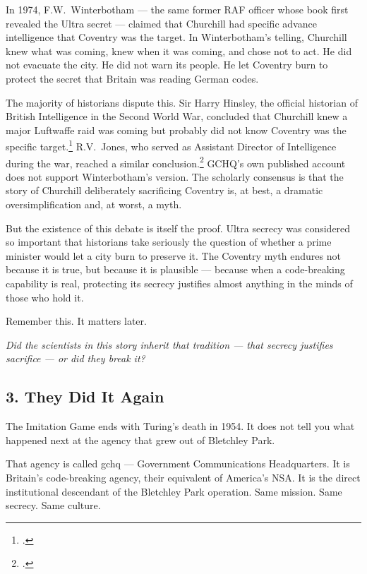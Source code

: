 In 1974, F.W.\ Winterbotham --- the same former RAF officer whose book first revealed the Ultra secret --- claimed that Churchill had specific advance intelligence that Coventry was the target. In Winterbotham's telling, Churchill knew what was coming, knew when it was coming, and chose not to act. He did not evacuate the city. He did not warn its people. He let Coventry burn to protect the secret that Britain was reading German codes.

The majority of historians dispute this. Sir Harry Hinsley, the official historian of British Intelligence in the Second World War, concluded that Churchill knew a major Luftwaffe raid was coming but probably did not know Coventry was the specific target.\footcite{hinsley1979} R.V.\ Jones, who served as Assistant Director of Intelligence during the war, reached a similar conclusion.\footcite{jones1978} GCHQ's own published account does not support Winterbotham's version. The scholarly consensus is that the story of Churchill deliberately sacrificing Coventry is, at best, a dramatic oversimplification and, at worst, a myth.

But the existence of this debate is itself the proof. Ultra secrecy was considered so important that historians take seriously the question of whether a prime minister would let a city burn to preserve it. The Coventry myth endures not because it is true, but because it is plausible --- because when a code-breaking capability is real, protecting its secrecy justifies almost anything in the minds of those who hold it.

Remember this. It matters later.

\vspace{0.5cm}
\noindent\textit{Did the scientists in this story inherit that tradition --- that secrecy justifies sacrifice --- or did they break it?}
\vspace{0.5cm}

\subsection*{3. They Did It Again}
\label{pos04:they-did-it-again}

The Imitation Game ends with Turing's death in 1954. It does not tell you what happened next at the agency that grew out of Bletchley Park.

That agency is called \gls{gchq} --- Government Communications Headquarters. It is Britain's code-breaking agency, their equivalent of America's NSA\@. It is the direct institutional descendant of the Bletchley Park operation. Same mission. Same secrecy. Same culture.

